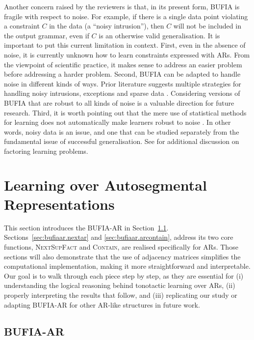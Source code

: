 \documentclass{CUP-JNL-PHO}%
\theoremstyle{definition}
\numberwithin{equation}{section}
\theoremstyle{definition}
\begin{document}
Another concern raised by the reviewers is that, in its
present form, BUFIA is fragile with respect to noise. For example, if
there is a single data point violating a constraint \(C\) in the
data (a ``noisy intrusion''), then \(C\) will not be included in the
output grammar, even if \(C\) is an otherwise valid
generalisation. It is important to put this current limitation in
context. First, even in the absence of noise, it is currently unknown
how to learn constraints expressed with ARs. From the viewpoint of
scientific practice, it makes sense to address an easier problem
before addressing a harder problem. Second, BUFIA can be adapted to
handle noise in different kinds of ways. Prior literature suggests
multiple strategies for handling noisy intrusions, exceptions and
sparse data \citep{angluin88, Yang2016, Wu-Heinz-2023-SELDNI,
  Kaelbling+2023-RILIPD, Dai2025}. Considering versions of BUFIA that
are robust to all kinds of noise is a valuable direction for future
research. Third, it is worth pointing out that the mere use of
statistical methods for learning does not automatically make learners
robust to noise \citep{Angluin88b}. In other words, noisy data is an
issue, and one that can be studied separately from the fundamental
issue of successful generalisation. See \citet{Heinz2009} for
additional discussion on factoring learning problems.

\section{Learning over Autosegmental Representations} \label{sec:bufiaar}

This section introduces the BUFIA-AR in Section~\ref{sec:bufiaar.algo}.
Sections~\ref{sec:bufiaar.nextar} and \ref{sec:bufiaar.arcontain}, 
address its two core functions, \textsc{NextSupFact} and 
\textsc{Contain}, are realised specifically for ARs.  Those sections will also demonstrate that the
use of adjacency matrices simplifies the computational implementation,
making it more straightforward and interpretable. Our goal is to walk
through each piece step by step, as they are essential for (i)
understanding the logical reasoning behind tonotactic learning over
ARs, (ii) properly interpreting the results that follow, and (iii)
replicating our study or adapting BUFIA-AR for other AR-like structures in future work.

\subsection{BUFIA-AR} \label{sec:bufiaar.algo}
\end{document}

